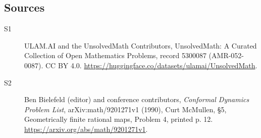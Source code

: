 \documentclass[11pt]{article}
\begin{document}
\subsection{Sources}
\begin{description}
\item[\hypertarget{source:5300087:1}{S1}] ULAM.AI and the UnsolvedMath Contributors, UnsolvedMath: A Curated Collection of Open Mathematics Problems, record 5300087 (AMR-052-0087). CC BY 4.0. \url{https://huggingface.co/datasets/ulamai/UnsolvedMath}.
\item[\hypertarget{source:5300087:2}{S2}] Ben Bielefeld (editor) and conference contributors, \emph{Conformal Dynamics Problem List}, arXiv:math/9201271v1 (1990), Curt McMullen, \S5, Geometrically finite rational maps, Problem 4, printed p. 12. \url{https://arxiv.org/abs/math/9201271v1}.
\end{description}
\label{end:5300087}
\end{document}
